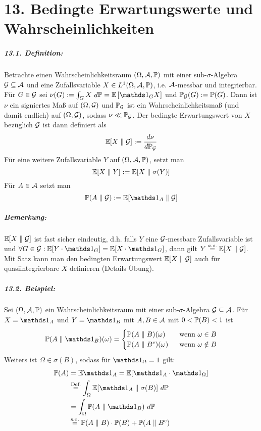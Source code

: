 \chapter*{13. Bedingte Erwartungswerte und Wahrscheinlichkeiten}
     \paragraph{13.1. Definition:} Betrachte einen Wahrscheinlichkeitsraum $(\Omega, \mathcal{A}, \mathbb{P})$ mit einer sub-$\sigma$-Algebra $\mathcal{G}\subseteq\mathcal{A}$ und eine Zufallsvariable $X\in L^1(\Omega, \mathcal{A}, \mathbb{P})$, i.e. $\mathcal{A}$-messbar und integrierbar. F\"ur $G\in\mathcal{G}$ sei $\nu(G):=\int_G X\ d\Pp=\E\left[\ind{G}X\right]$ und $\mathbb{P}_{\mathcal{G}}(G):=\mathbb{P}(G)$. Dann ist $\nu$ ein signiertes Ma\ss{} auf $(\Omega,\mathcal{G})$ und $\mathbb{P}_{\mathcal{G}}$ ist ein Wahrscheinlichkeitsma\ss{} (und damit endlich) auf $(\Omega,\mathcal{G})$, sodass $\nu\ll\mathbb{P}_{\mathcal{G}}$. \newline
     Der bedingte Erwartungswert von $X$ bez\"uglich $\mathcal{G}$ ist dann definiert als
     $$\mathbb{E}[X\parallel \mathcal{G}]:=\dfrac{d\nu}{d\mathbb{P}_{\mathcal{G}}}$$
     F\"ur eine weitere Zufallsvariable $Y$ auf $(\Omega, \mathcal{A}, \mathbb{P})$, setzt man 
     $$\mathbb{E}[X\parallel Y]:=\mathbb{E}[X\parallel\sigma(Y)]$$
     F\"ur $A\in\mathcal{A}$ setzt man
     $$\Pp(A\parallel\G):=\E[\ind{A}\parallel\G]$$
     
     \paragraph{Bemerkung:}$\mathbb{E}[X\parallel\mathcal{G}]$ ist fast sicher eindeutig, d.h. falls $Y$ eine $\mathcal{G}$-messbare Zufallsvariable ist und $\forall G\in\G:\E[Y\cdot\ind{G}]=\E[X\cdot\ind{G}]$, dann gilt $Y\overset{a.s.}{=}\mathbb{E}[X\parallel\mathcal{G}]$. Mit Satz kann man den bedingten Erwartungswert $\mathbb{E}[X\parallel\mathcal{G}]$ auch f\"ur quasiintegrierbare $X$ definieren (Details \"Ubung).

     \paragraph{13.2. Beispiel:}Sei $(\Omega, \mathcal{A}, \mathbb{P})$ ein Wahrscheinlichkeitsraum mit einer sub-$\sigma$-Algebra $\mathcal{G}\subseteq\mathcal{A}$. F\"ur $X=\ind{A}$ und $Y=\ind{B}$ mit $A,B\in\mathcal{A}$ mit $0<\mathbb{P}(B)<1$ ist
     \begin{align*}
         \Pp(A\parallel \ind{B})(\omega)=
         \begin{cases}
             \Pp(A\parallel B)(\omega)\ \ &\text{ wenn }\omega\in B \\
             \Pp(A\parallel B^c)(\omega)&\text{ wenn }\omega\notin B
         \end{cases}
     \end{align*}
     Weiters ist $\Omega\in\sigma(B)$, sodass f\"ur $\ind{\Omega}=1$ gilt:
     \begin{align*}
         \Pp(A)&=\E\ind{A}=\E[\ind{A}\cdot\ind{\Omega}]\\
         &\overset{\text{Def.}}{=}\int_\Omega\E[\ind{A}\parallel\sigma(B)]\ d\Pp\\
         &=\int_\Omega\Pp(A\parallel\ind{B})\ d\Pp \\
         &\overset{\text{s.o.}}{=}\Pp(A\parallel B)\cdot\Pp(B)+\Pp(A\parallel B^c)
     \end{align*}


